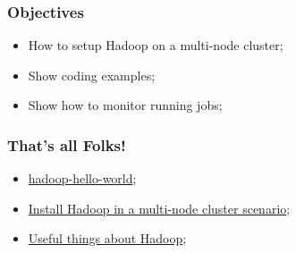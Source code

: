 \documentclass[aspectratio=169]{beamer}
\begin{document}
\begin{frame}
	\frametitle{Objectives}

	\begin{itemize}
		\item How to setup Hadoop on a multi-node cluster;
		\item Show coding examples;
		\item Show how to monitor running jobs;
	\end{itemize}
\end{frame}

\begin{frame}
	\frametitle{That's all Folks!}

	\begin{itemize}
		\item \href{https://github.com/claudioscheer/hadoop-hello-world}{hadoop-hello-world};
		\item \href{https://github.com/claudioscheer/claudioscheer.github.io/blob/master/posts/hadoop/install-hadoop-multi-node-cluster.md}{Install Hadoop in a multi-node cluster scenario};
		\item \href{https://github.com/claudioscheer/claudioscheer.github.io/blob/master/posts/hadoop/useful-things-about-hadoop.md}{Useful things about Hadoop};
	\end{itemize}
\end{frame}
\end{document}

